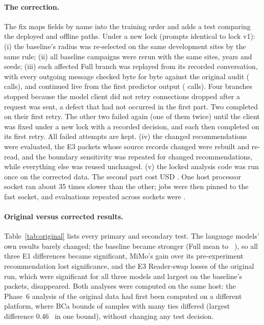 \paragraph{The correction.} The fix maps fields by name into the training order and adds a test comparing the deployed and offline paths. Under a new lock (prompts identical to lock v1): (i) the baseline's radius was re-selected on the same development sites by the same rule; (ii) all  baseline campaigns were rerun with the same sites, years and seeds; (iii) each affected Full branch was replayed from its recorded conversation, with every outgoing message checked byte for byte against the original audit ( calls), and continued live from the first predictor output ( calls). Four branches stopped because the model client did not retry connections dropped after a request was sent, a defect that had not occurred in the first part. Two completed on their first retry. The other two failed again (one of them twice) until the client was fixed under a new lock with a recorded decision, and each then completed on its first retry. All  failed attempts are kept. (iv) the  changed recommendations were evaluated, the  E3 packets whose source records changed were rebuilt and re-read, and the boundary sensitivity was repeated for changed recommendations, while everything else was reused unchanged. (v) the locked analysis code was run once on the corrected data. The second part cost USD . One host processor socket ran about 35 times slower than the other; jobs were then pinned to the fast socket, and evaluations repeated across sockets were .

\paragraph{Original versus corrected results.} Table~\ref{tab:original} lists every primary and secondary test. The language models' own results barely changed; the baseline became stronger (Full mean  to ~\eur{}), so all three E1 differences became significant, MiMo's gain over its pre-experiment recommendation lost significance, and the E3 Reader-swap losses of the original run, which were significant for all three models and largest on the baseline's packets, disappeared. Both analyses were computed on the same host: the Phase~6 analysis of the original data had first been computed on a different platform, where BCa bounds of samples with many ties differed (largest difference 0.46~\eur{} in one bound), without changing any test decision.

